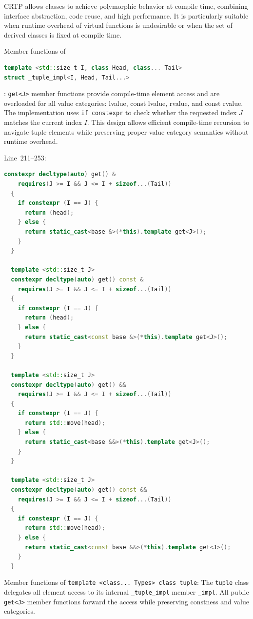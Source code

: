 \documentclass[a4paper,12pt]{article}
\begin{document}
CRTP allows classes to achieve polymorphic behavior at compile time, combining interface abstraction, code reuse, and high performance. It is particularly suitable when runtime overhead of virtual functions is undesirable or when the set of derived classes is fixed at compile time.
\bit
\item Member functions of
\begin{lstlisting}[language=C++]
template <std::size_t I, class Head, class... Tail>
struct _tuple_impl<I, Head, Tail...>
\end{lstlisting}
: \texttt{get<J>} member functions provide compile-time element access and are overloaded for all value categories: lvalue, const lvalue, rvalue, and const rvalue. The implementation uses \texttt{if constexpr} to check whether the requested index $J$ matches the current index $I$. This design allows efficient compile-time recursion to navigate tuple elements while preserving proper value category semantics without runtime overhead.

Line~211--253:
\begin{lstlisting}[language=C++]
  constexpr decltype(auto) get() &
    requires(J >= I && J <= I + sizeof...(Tail))
  {
    if constexpr (I == J) {
      return (head);
    } else {
      return static_cast<base &>(*this).template get<J>();
    }
  }

  template <std::size_t J>
  constexpr decltype(auto) get() const &
    requires(J >= I && J <= I + sizeof...(Tail))
  {
    if constexpr (I == J) {
      return (head);
    } else {
      return static_cast<const base &>(*this).template get<J>();
    }
  }

  template <std::size_t J>
  constexpr decltype(auto) get() &&
    requires(J >= I && J <= I + sizeof...(Tail))
  {
    if constexpr (I == J) {
      return std::move(head);
    } else {
      return static_cast<base &&>(*this).template get<J>();
    }
  }

  template <std::size_t J>
  constexpr decltype(auto) get() const &&
    requires(J >= I && J <= I + sizeof...(Tail))
  {
    if constexpr (I == J) {
      return std::move(head);
    } else {
      return static_cast<const base &&>(*this).template get<J>();
    }
  }
\end{lstlisting}
\item Member functions of \verb|template <class... Types> class tuple|: The \texttt{tuple} class delegates all element access to its internal \texttt{\_tuple\_impl} member \texttt{\_impl}. All public \texttt{get<J>} member functions forward the access while preserving constness and value categories.
\end{document}
